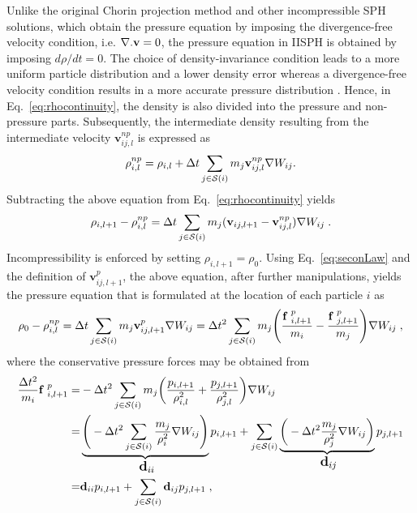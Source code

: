 Unlike the original Chorin projection method and other incompressible SPH solutions, which obtain the pressure equation by imposing the divergence-free velocity condition, i.e.  $\nabla.\mathbf{v}= 0$, the pressure equation in IISPH is obtained by imposing $d\rho/dt=0$. The choice of density-invariance condition leads to a more uniform particle distribution and a lower density error whereas a divergence-free velocity condition results in a more accurate pressure distribution \cite{asai2012stabilized}. Hence, in Eq.~\ref{eq:rhocontinuity}, the density is also divided into the pressure and non-pressure parts. Subsequently, the intermediate density resulting from the intermediate velocity $\mathbf v_{ij,l}^{np}$ is expressed as
\begin{equation}\label{eq:rhonp}
\rho_{i,l}^{np}=\rho_{i,l}+\Delta t \sum_{j \in {\cal S}(i)} m_j \mathbf v_{ij,l}^{np}\nabla W_{ij}.
\end{equation}
Subtracting the above equation from Eq.~\ref{eq:rhocontinuity} yields
\begin{equation}\label{eq:continuity3_IISPH}
\rho_{i,l+1}- \rho_{i,l}^{np}=\Delta t \sum_{j \in {\cal S}(i)} m_j (\mathbf v_{ij,l+1}-\mathbf v_{ij,l}^{np})\nabla W_{ij} \; .
\end{equation}
Incompressibility is enforced by setting $\rho_{i,l+1}= \rho _0 $. Using Eq.~\ref{eq:seconLaw} and the definition of $\mathbf v_{ij,l+1}^{p}$, the above equation, after further manipulations, yields the pressure equation that is formulated at the location of each particle $i$ as
\begin{equation}\label{eq:continuity4_IISPH}
\rho _0- \rho_{i,l}^{np}=\Delta t \sum_{j \in {\cal S}(i)} m_j \mathbf v_{ij,l+1}^{p}\nabla W_{ij}
= \Delta t^2 \sum_{j \in {\cal S}(i)} m_j \Bigg(\frac{{\bf f}\;^{p}_{i,l+1}}{ m_i}-\frac{{\bf f}\;^{p}_{j,l+1}}{ m_j}\Bigg)\nabla W_{ij} \; ,
\end{equation}
where the conservative pressure forces may be obtained from \cite{ihmsen2014implicit}
\begin{equation}\label{eq:Fi}
\begin{split}
\frac{\Delta t^2}{m_i}  {\bf f}\;^{p}_{i,l+1}=& -\Delta t^2 \sum_{j \in {\cal S}(i)} m_j \bigg(\frac{p_{i,l+1}}{\rho_{i,l}^2}+\frac{p_{j,l+1}}{\rho_{j,l}^2}\bigg) \nabla W_{ij} \\=& \underbrace{\Bigg( -\Delta t^2    \sum_{j \in {\cal S}(i)}  \frac{m_j}{\rho_i^2} \nabla W_{ij}\Bigg)}_{\text{ \large $\mathbf{d}_{ii}$}  } p_{i,l+1} + \sum_{j \in {\cal S}(i)} \underbrace{ \bigg( -\Delta t^2 \frac{m_j}{\rho_j^2} \nabla W_{ij}\bigg)}_{\text{ \large $\mathbf{d}_{ij}$}}  p_{j,l+1}\\=& \mathbf{d}_{ii} p_{i,l+1}+\sum_{j \in {\cal S}(i)} \mathbf{d}_{ij} p_{j,l+1} \; ,
\end{split} 
\end{equation}
